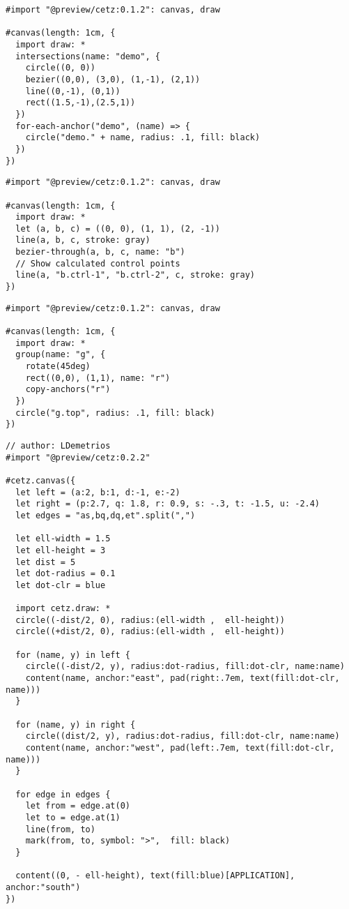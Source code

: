 \begin{verbatim}
#import "@preview/cetz:0.1.2": canvas, draw

#canvas(length: 1cm, {
  import draw: *
  intersections(name: "demo", {
    circle((0, 0))
    bezier((0,0), (3,0), (1,-1), (2,1))
    line((0,-1), (0,1))
    rect((1.5,-1),(2.5,1))
  })
  for-each-anchor("demo", (name) => {
    circle("demo." + name, radius: .1, fill: black)
  })
})
\end{verbatim}

\pandocbounded{}

\begin{verbatim}
#import "@preview/cetz:0.1.2": canvas, draw

#canvas(length: 1cm, {
  import draw: *
  let (a, b, c) = ((0, 0), (1, 1), (2, -1))
  line(a, b, c, stroke: gray)
  bezier-through(a, b, c, name: "b")
  // Show calculated control points
  line(a, "b.ctrl-1", "b.ctrl-2", c, stroke: gray)
})
\end{verbatim}

\pandocbounded{}

\begin{verbatim}
#import "@preview/cetz:0.1.2": canvas, draw

#canvas(length: 1cm, {
  import draw: *
  group(name: "g", {
    rotate(45deg)
    rect((0,0), (1,1), name: "r")
    copy-anchors("r")
  })
  circle("g.top", radius: .1, fill: black)
})
\end{verbatim}

\pandocbounded{}

\begin{verbatim}
// author: LDemetrios
#import "@preview/cetz:0.2.2"

#cetz.canvas({
  let left = (a:2, b:1, d:-1, e:-2)
  let right = (p:2.7, q: 1.8, r: 0.9, s: -.3, t: -1.5, u: -2.4)
  let edges = "as,bq,dq,et".split(",")

  let ell-width = 1.5
  let ell-height = 3
  let dist = 5
  let dot-radius = 0.1
  let dot-clr = blue

  import cetz.draw: *
  circle((-dist/2, 0), radius:(ell-width ,  ell-height))
  circle((+dist/2, 0), radius:(ell-width ,  ell-height))

  for (name, y) in left {
    circle((-dist/2, y), radius:dot-radius, fill:dot-clr, name:name)
    content(name, anchor:"east", pad(right:.7em, text(fill:dot-clr, name)))
  }

  for (name, y) in right {
    circle((dist/2, y), radius:dot-radius, fill:dot-clr, name:name)
    content(name, anchor:"west", pad(left:.7em, text(fill:dot-clr, name)))
  }

  for edge in edges {
    let from = edge.at(0)
    let to = edge.at(1)
    line(from, to)
    mark(from, to, symbol: ">",  fill: black)
  }

  content((0, - ell-height), text(fill:blue)[APPLICATION], anchor:"south")
})
\end{verbatim}


